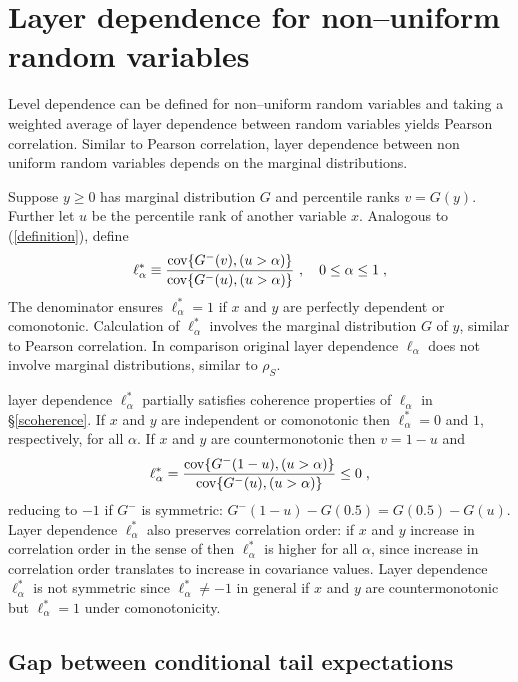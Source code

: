 \documentclass[authoryear]{elsarticle}
\newcommand{\cov}{{\rm cov}}
\newcommand{\cq}{\ ,\quad }
\newcommand{\eref}[1]{(\ref{#1})}
\newcommand{\sref}[1]{\S\ref{#1}}
\begin{document}
\section{Layer dependence for non--uniform random variables}\label{soriginal}

Level dependence can be defined for non--uniform random variables and  taking a weighted average of layer dependence between  random variables yields Pearson correlation. Similar to Pearson correlation, layer dependence between non uniform random variables depends on the marginal distributions.

Suppose $y\geq 0$ has marginal distribution $G$   and percentile ranks $v=G(y)$.  Further let $u$ be the percentile rank of another variable $x$.  Analogous to \eref{definition}, define
\begin{equation}\label{gaporiginal}
\ell_\alpha^* \equiv \frac{\cov\{G^-(v),(u>\alpha)\}}{\cov\{G^-(u),(u>\alpha)\}}
 \cq 0\leq\alpha\leq 1 \;,
\end{equation}
The denominator  ensures $\ell_\alpha^*=1$ if $x$ and $y$ are perfectly dependent or comonotonic. Calculation of $\ell_\alpha^*$ involves the marginal distribution $G$ of $y$, similar to Pearson correlation. In comparison original layer dependence $\ell_\alpha$ does not involve marginal distributions, similar to  $\rho_S$.


layer dependence $\ell_\alpha^*$ partially satisfies coherence properties of $\ell_\alpha$ in \sref{scoherence}. If $x$ and $y$ are independent or comonotonic then $\ell_\alpha^*=0$ and $1$, respectively, for all $\alpha$. If $x$ and $y$ are countermonotonic then $v=1-u$ and
$$
\ell_\alpha^*  =\frac{\cov\{G^-(1-u),(u>\alpha)\}}{\cov\{G^-(u),(u>\alpha)\}} \leq 0 \;,
$$
reducing to $-1$ if $G^-$ is symmetric: $G^-(1-u)-G(0.5)=G(0.5)-G(u)$. Layer dependence $\ell_\alpha^*$ also preserves correlation order: if $x$ and $y$ increase in correlation order in the sense of \cite{dhaene2009correlation} then $\ell_\alpha^*$ is higher for all $\alpha$, since increase in correlation order translates to increase in covariance values. Layer dependence $\ell_\alpha^*$ is not symmetric since $\ell_\alpha^*\neq -1$ in general if $x$ and $y$ are countermonotonic but $\ell_\alpha^*=1$ under comonotonicity.

\subsection{Gap between conditional tail expectations}
\end{document}
